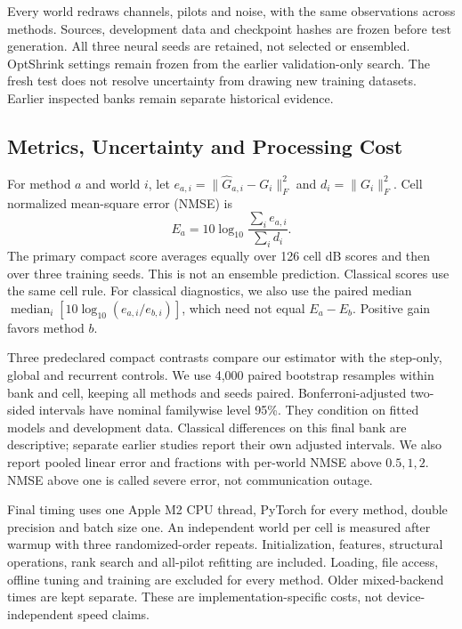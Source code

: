 \documentclass[10pt,journal,letterpaper]{IEEEtran}
\DeclareMathOperator{\median}{median}
\begin{document}
Every world redraws channels, pilots and noise, with the same observations across methods. Sources, development data and checkpoint hashes are frozen before test generation. All three neural seeds are retained, not selected or ensembled. OptShrink settings remain frozen from the earlier validation-only search. The fresh test does not resolve uncertainty from drawing new training datasets. Earlier inspected banks remain separate historical evidence.

\subsection{Metrics, Uncertainty and Processing Cost}
For method $a$ and world $i$, let $e_{a,i}=\|\widehat G_{a,i}-G_i\|_F^2$ and $d_i=\|G_i\|_F^2$. Cell normalized mean-square error (NMSE) is
\begin{equation}
 E_a=10\log_{10}\frac{\sum_i e_{a,i}}{\sum_i d_i}.
 \label{eq:nmse}
\end{equation}
The primary compact score averages equally over 126 cell dB scores and then over three training seeds. This is not an ensemble prediction. Classical scores use the same cell rule. For classical diagnostics, we also use the paired median $\median_i[10\log_{10}(e_{a,i}/e_{b,i})]$, which need not equal $E_a-E_b$. Positive gain favors method $b$.

Three predeclared compact contrasts compare our estimator with the step-only, global and recurrent controls. We use 4,000 paired bootstrap resamples within bank and cell, keeping all methods and seeds paired. Bonferroni-adjusted two-sided intervals have nominal familywise level 95\%. They condition on fitted models and development data. Classical differences on this final bank are descriptive; separate earlier studies report their own adjusted intervals. We also report pooled linear error and fractions with per-world NMSE above $0.5,1,2$. NMSE above one is called severe error, not communication outage.

Final timing uses one Apple M2 CPU thread, PyTorch for every method, double precision and batch size one. An independent world per cell is measured after warmup with three randomized-order repeats. Initialization, features, structural operations, rank search and all-pilot refitting are included. Loading, file access, offline tuning and training are excluded for every method. Older mixed-backend times are kept separate. These are implementation-specific costs, not device-independent speed claims.
\end{document}
